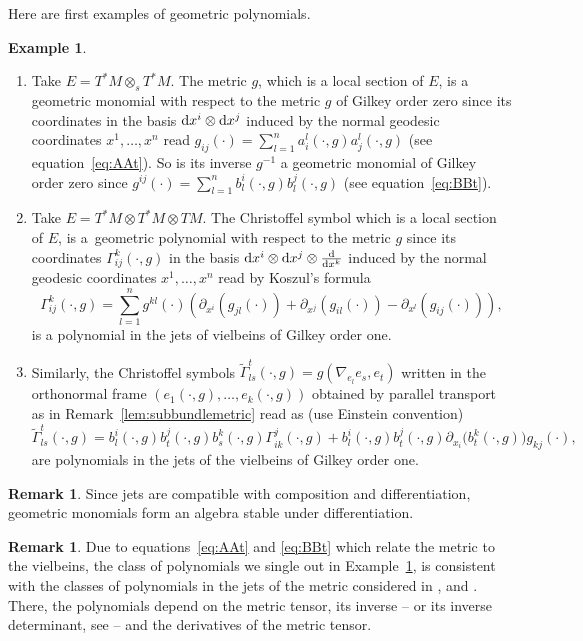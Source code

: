 \documentclass[10pt,a4paper]{amsart}
\numberwithin{equation}{section}
\theoremstyle{definition}
\newtheorem{rk}[thm]{Remark}
\newtheorem{ex}[thm]{Example}
\begin{document}
Here are first examples of geometric polynomials.
\begin{ex}\label{ex:geompolTM}\quad
\begin{enumerate}\itemsep=0pt
\item Take $E=T^*M\otimes_s T^*M$. The metric $g$, which is a local section of $E$, is a geometric monomial with respect to the metric $g$ of Gilkey order zero since its coordinates in the basis ${\rm d}x^i \otimes {\rm d}x^j$ induced by the normal geodesic coordinates $x^1, \dots, x^n$ read
$g_{ij}(\cdot)=	\sum_{l=1}^n a_i^l(\cdot, g)a_j^l(\cdot, g)$ (see equation~\eqref{eq:AAt}). So is its inverse $g^{-1}$ a geometric monomial of Gilkey order zero since
$ g^{ij}(\cdot)=\sum_{l=1}^n b_l^i(\cdot,g) b_l^j(\cdot,g)$ (see equation~\eqref{eq:BBt}).
\item Take $E= T^*M\otimes T^*M \otimes TM$. The Christoffel symbol which is a local section of $E$, is a~geometric polynomial with respect to the metric $g$ since its coordinates $\Gamma_{ij}^k(\cdot,g)$ in the basis ${\rm d}x^i \otimes {\rm d}x^j\otimes \frac{{\rm d}}{{\rm d}x^k}$ induced by the normal geodesic coordinates $x^1, \dots, x^n$ read by Koszul's formula
\begin{equation}\label{eq:Koszul}\Gamma_{i j}^k(\cdot,g)=\sum_{l=1}^n g^{k l}(\cdot)\left(\partial_{x^i}(g_{jl}(\cdot))+\partial_{x^j}(g_{il}(\cdot))-\partial_{x^l}(g_{i j}(\cdot))\right),
\end{equation}
is a polynomial in the jets of vielbeins of Gilkey order one.
	
\item Similarly, the Christoffel symbols $\tilde\Gamma_{ls}^t(\cdot,g)=g(\nabla_{e_l}e_s,e_t)$ written in the orthonormal frame $(e_1(\cdot, g), \dots, e_k(\cdot, g))$ obtained by parallel transport as in Remark~\ref{lem:subbundlemetric} read as (use Einstein convention)
\begin{equation}\label{eq:relationschristofellsymbols}
\tilde\Gamma_{l s}^t (\cdot, g)=b_l^i(\cdot, g) b_t^j(\cdot, g) b_s^k(\cdot, g) \Gamma_{i k}^j (\cdot, g)+ b_l^i(\cdot, g) b_t^j(\cdot, g) \partial_{x_i}\bigl(b_t^k(\cdot, g)\bigr) g_{k j}(\cdot),
\end{equation}
are polynomials in the jets of the vielbeins of Gilkey order one.
\end{enumerate}
\end{ex}

\begin{rk}
Since jets are compatible with composition and differentiation, geometric monomials form an algebra stable under differentiation.
\end{rk}
\begin{rk}
	Due to equations~\eqref{eq:AAt} and \eqref{eq:BBt} which relate the metric to the vielbeins, the class of polynomials we single out in Example~\ref{ex:geompolTM},
	is consistent with the classes of polynomials in the jets of the metric considered in \cite{ABP}, \cite[Theorem 1.2]{E} and \cite[equation~(2.4.3)]{G}. There, the polynomials depend on the metric tensor, its inverse -- or its inverse determinant, see \cite[formula, item~1, p.~282]{ABP} -- and the derivatives of the metric tensor.
\end{rk}
\end{document}
